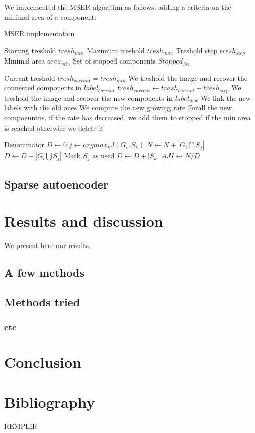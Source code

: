 \documentclass{report}
\begin{document}
We implemented the MSER algorithm as follows, adding a criteria on the minimal area of a component:
\begin{algorithm}
\caption{MSER implementation}
\begin{algorithmic} 
\STATE Starting treshold $tresh_{min}$
\STATE Maximum treshold $tresh_{max}$
\STATE Treshold step $tresh_{step}$
\STATE Minimal area $area_{min}$ 
\STATE Set of stopped components $Stopped_{Set}$ \newline

\STATE Current treshold $tresh_{current} = tresh_{min}$
\STATE We treshold the image and recover the connected components in $label_{current}$
	\STATE $tresh_{current} \leftarrow tresh_{current} + tresh_{step}$
	\STATE We treshold the image and recover the new components in $label_{new}$
	\STATE We link the new labels with the old ones
	\STATE We compute the new growing rate
	\STATE Forall the new compoenntns, if the rate has decreased, we add them to stopped if the min area is reached otherwise we delete it
\ENDWHILE

\STATE Denominator $D \leftarrow 0$
\STATE $j \leftarrow argmax_k J(G_i, S_k)$
\STATE $N \leftarrow N+|G_i\bigcap S_j|$
\STATE $D \leftarrow D+|G_i\bigcup S_j|$
\STATE Mark $S_j$ as used
\ENDFOR
{}
\STATE $D \leftarrow D + |S_k|$
\ENDIF
\ENDFOR
\STATE $AJI \leftarrow N/D$
\end{algorithmic}
\end{algorithm}
  



\section{Sparse autoencoder}

\chapter{Results and discussion}
We present here our results.

\section{A few methods}
\section{Methods tried}
\subsection{etc}

\chapter{Conclusion}

\chapter{Bibliography}
REMPLIR
\end{document}
